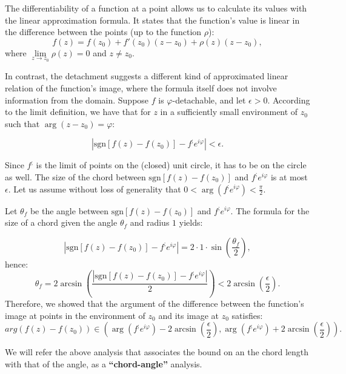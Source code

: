 \documentclass[11pt]{book}
\begin{document}
The differentiability of a function at a point allows us to calculate its values with the linear approximation formula. It states that the function's value is linear in the difference between the points (up to the function $\rho$):
$$f\left(z\right)=f\left(z_{0}\right)+f'\left(z_{0}\right)\left(z-z_{0}\right)+\rho\left(z\right)\left(z-z_{0}\right),$$
where $\underset{z\to z_{0}}{\lim}\rho\left(z\right)=0$ and $z\neq z_{0}.$

In contrast, the detachment suggests a different kind of approximated linear relation of the function's image, where the formula itself does not involve information from the domain. Suppose $f$ is $\varphi$-detachable, and let $\epsilon>0.$ According to the limit definition, we have that for $z$ in a sufficiently small environment of $z_{0}$ such that $\arg\left(z-z_{0}\right)=\varphi$:

$$\left|\text{sgn}\left[f\left(z\right)-f\left(z_{0}\right)\right]-f^{;} e^{i\varphi} \right|<\epsilon.$$

Since $f^{;}$ is the limit of points on the (closed) unit circle, it has to be on the circle as well. The size of the chord between $\text{sgn}\left[f\left(z\right)-f\left(z_{0}\right)\right]$ and $f^{;}e^{i\varphi}$ is at most $\epsilon.$ Let us assume without loss of generality that $0<\arg\left(f^{;}e^{i\varphi}\right)<\frac{\pi}{2}.$

Let $\theta_{f}$ be the angle between $\text{sgn}\left[f\left(z\right)-f\left(z_{0}\right)\right]$ and $f^{;}e^{i\varphi}.$ The formula for the size of a chord given the angle $\theta_{f}$ and radius $1$ yields:

$$\left|\text{sgn}\left[f\left(z\right)-f\left(z_{0}\right)\right]-f^{;}e^{i\varphi}\right|=2\cdot1\cdot\sin\left(\frac{\theta_{f}}{2}\right),$$
hence:
$$\theta_{f}=2\arcsin\left(\frac{\left|\text{sgn}\left[f\left(z\right)-f\left(z_{0}\right)\right]-f^{;}e^{i\varphi}\right|}{2}\right)<2\arcsin\left(\frac{\epsilon}{2}\right).$$
Therefore, we showed that the argument of the difference between the function's image at points in the environment of $z_{0}$ and its image at $z_{0}$ satisfies: $$arg\left(f\left(z\right)-f\left(z_{0}\right)\right)\in\left(\arg\left(f^{;}e^{i\varphi}\right)-2\arcsin\left(\frac{\epsilon}{2}\right),\arg\left(f^{;}e^{i\varphi}\right)+2\arcsin\left(\frac{\epsilon}{2}\right)\right).\label{arg_delta_f_bounds}$$

We will refer the above analysis that associates the bound on an the chord length with that of the angle, as a \textbf{“chord-angle”} analysis.
\end{document}
